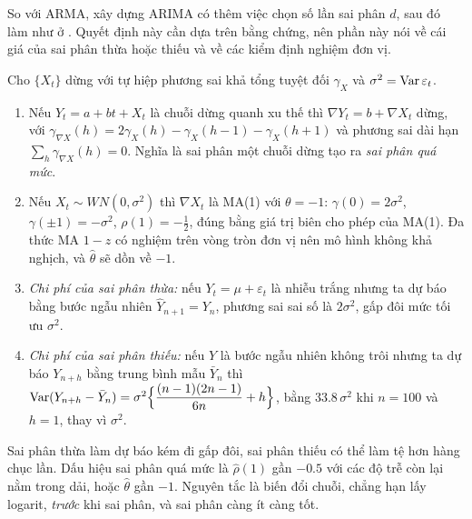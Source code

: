 So với ARMA, xây dựng ARIMA có thêm việc chọn số lần sai phân $d$, sau đó làm như ở . Quyết định này cần dựa trên bằng chứng, nên phần này nói về cái giá của sai phân thừa hoặc thiếu và về các kiểm định nghiệm đơn vị.

\begin{kq}
Cho $\{X_t\}$ dừng với tự hiệp phương sai khả tổng tuyệt đối $\gamma_X$ và $\sigma^2=\operatorname{Var}\varepsilon_t$.
\begin{enumerate}[label=(\roman*),leftmargin=*,itemsep=1pt]
\item Nếu $Y_t=a+bt+X_t$ là chuỗi dừng quanh xu thế thì $\nabla Y_t=b+\nabla X_t$ dừng, với $\gamma_{\nabla X}(h)=2\gamma_X(h)-\gamma_X(h-1)-\gamma_X(h+1)$ và phương sai dài hạn $\sum_h\gamma_{\nabla X}(h)=0$. Nghĩa là sai phân một chuỗi dừng tạo ra \emph{sai phân quá mức}.
\item Nếu $X_t\sim WN(0,\sigma^2)$ thì $\nabla X_t$ là MA(1) với $\theta=-1$: $\gamma(0)=2\sigma^2$, $\gamma(\pm1)=-\sigma^2$, $\rho(1)=-\tfrac12$, đúng bằng giá trị biên cho phép của MA(1). Đa thức MA $1-z$ có nghiệm trên vòng tròn đơn vị nên mô hình không khả nghịch, và $\hat\theta$ sẽ dồn về $-1$.
\item \emph{Chi phí của sai phân thừa:} nếu $Y_t=\mu+\varepsilon_t$ là nhiễu trắng nhưng ta dự báo bằng bước ngẫu nhiên $\hat Y_{n+1}=Y_n$, phương sai sai số là $2\sigma^2$, gấp đôi mức tối ưu $\sigma^2$.
\item \emph{Chi phí của sai phân thiếu:} nếu $Y$ là bước ngẫu nhiên không trôi nhưng ta dự báo $Y_{n+h}$ bằng trung bình mẫu $\bar Y_n$ thì $\operatorname{Var}(Y_{n+h}-\bar Y_n)=\sigma^2\Bigl\{\dfrac{(n-1)(2n-1)}{6n}+h\Bigr\}$, bằng $33.8\,\sigma^2$ khi $n=100$ và $h=1$, thay vì $\sigma^2$.
\end{enumerate}
\end{kq}
Sai phân thừa làm dự báo kém đi gấp đôi, sai phân thiếu có thể làm tệ hơn hàng chục lần. Dấu hiệu sai phân quá mức là $\hat\rho(1)$ gần $-0.5$ với các độ trễ còn lại nằm trong dải, hoặc $\hat\theta$ gần $-1$. Nguyên tắc là biến đổi chuỗi, chẳng hạn lấy logarit, \emph{trước} khi sai phân, và sai phân càng ít càng tốt.

